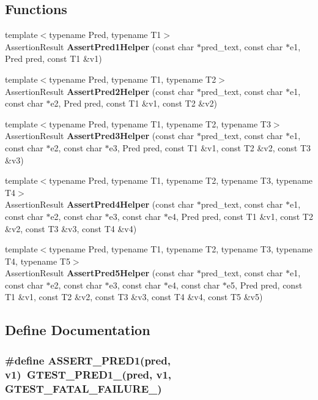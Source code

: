 \subsection*{Functions}
\begin{CompactItemize}
\item 
{\footnotesize template$<$typename Pred, typename T1$>$ }\\AssertionResult {\bf AssertPred1Helper} (const char $\ast$pred\_\-text, const char $\ast$e1, Pred pred, const T1 \&v1)
\item 
{\footnotesize template$<$typename Pred, typename T1, typename T2$>$ }\\AssertionResult {\bf AssertPred2Helper} (const char $\ast$pred\_\-text, const char $\ast$e1, const char $\ast$e2, Pred pred, const T1 \&v1, const T2 \&v2)
\item 
{\footnotesize template$<$typename Pred, typename T1, typename T2, typename T3$>$ }\\AssertionResult {\bf AssertPred3Helper} (const char $\ast$pred\_\-text, const char $\ast$e1, const char $\ast$e2, const char $\ast$e3, Pred pred, const T1 \&v1, const T2 \&v2, const T3 \&v3)
\item 
{\footnotesize template$<$typename Pred, typename T1, typename T2, typename T3, typename T4$>$ }\\AssertionResult {\bf AssertPred4Helper} (const char $\ast$pred\_\-text, const char $\ast$e1, const char $\ast$e2, const char $\ast$e3, const char $\ast$e4, Pred pred, const T1 \&v1, const T2 \&v2, const T3 \&v3, const T4 \&v4)
\item 
{\footnotesize template$<$typename Pred, typename T1, typename T2, typename T3, typename T4, typename T5$>$ }\\AssertionResult {\bf AssertPred5Helper} (const char $\ast$pred\_\-text, const char $\ast$e1, const char $\ast$e2, const char $\ast$e3, const char $\ast$e4, const char $\ast$e5, Pred pred, const T1 \&v1, const T2 \&v2, const T3 \&v3, const T4 \&v4, const T5 \&v5)
\end{CompactItemize}


\subsection{Define Documentation}
\subsubsection{\setlength{\rightskip}{0pt plus 5cm}\#define ASSERT\_\-PRED1(pred, v1)~GTEST\_\-PRED1\_\-(pred, v1, GTEST\_\-FATAL\_\-FAILURE\_\-)}\label{gtest__pred__impl_8h_a51f864a7cf311d9fb655a96197ef235}


